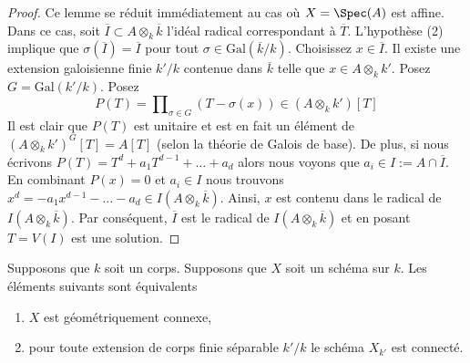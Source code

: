 \begin{proof}
Ce lemme se réduit immédiatement au cas où $X = \Spec(A)$
est affine. Dans ce cas, soit $\overline{I} \subset A
\otimes_k \overline{k}$ l'idéal radical correspondant à
$\overline{T}$. L'hypothèse (2) implique que
$\sigma(\overline{I}) = \overline{I}$ pour tout $\sigma \in
\text{Gal}(\overline{k}/k)$. Choisissez $x \in \overline{I}$. Il
existe une extension galoisienne finie $k'/k$ contenue dans
$\overline{k}$ telle que $x \in A \otimes_k k'$. Posez $G = \text{Gal}(k'/k)$. Posez
$$
P(T) = \prod\nolimits_{\sigma \in G} (T - \sigma(x)) \in (A \otimes_k k')[T]
$$
Il est clair que $P(T)$ est unitaire et est en fait un élément
de $(A \otimes_k k')^G[T] = A[T]$ (selon la théorie de Galois de
base). De plus, si nous écrivons $P(T) = T^d + a_1T^{d - 1} +
\ldots + a_d$ alors nous voyons que $a_i \in I := A \cap
\overline{I}$. En combinant $P(x) = 0$ et $a_i \in I$ nous
trouvons $x^d = - a_1 x^{d - 1} - \ldots - a_d \in I(A \otimes_k
\overline{k})$. Ainsi, $x$ est contenu dans le radical de $I(A
\otimes_k \overline{k})$. Par conséquent, $\overline{I}$ est le radical
de $I(A \otimes_k \overline{k})$ et en posant $T = V(I)$ est une solution.
\end{proof}

\begin{lemma}
\label{lemma-characterize-geometrically-disconnected}
Supposons que $k$ soit un corps.
Supposons que $X$ soit un schéma sur
$k$. Les éléments suivants sont équivalents
\begin{enumerate}
\item $X$ est géométriquement connexe,
\item pour toute extension de corps finie
séparable $k'/k$ le schéma $X_{k'}$ est connecté.
\end{enumerate}
\end{lemma}

